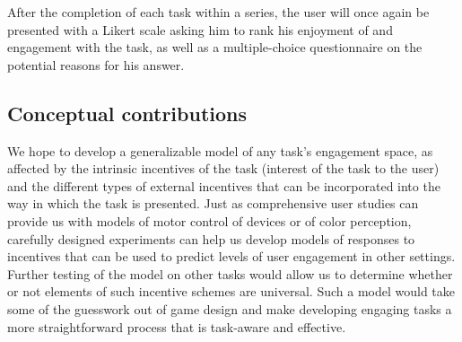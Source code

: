 \documentclass{sigchi}
\begin{document}
After the completion of each task within a series, the user will once again be presented with a Likert scale asking him to rank his enjoyment of and engagement with the task, as well as a multiple-choice questionnaire on the potential reasons for his answer.

\subsection{Conceptual contributions}

We hope to develop a generalizable model of any task's engagement space, as affected by the intrinsic incentives of the task (interest of the task to the user) and the different types of external incentives that can be incorporated into the way in which the task is presented. Just as comprehensive user studies can provide us with models of motor control of devices or of color perception, carefully designed experiments can help us develop models of responses to incentives that can be used to predict levels of user engagement in other settings. Further testing of the model on other tasks would allow us to determine whether or not elements of such incentive schemes are universal. Such a model would take some of the guesswork out of game design and make developing engaging tasks a more straightforward process that is task-aware and effective.


%
%
%
%
%
\balance



\end{document}
